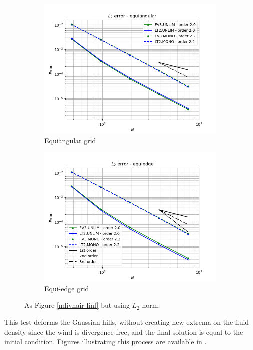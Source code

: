 \documentclass[preprint,12pt]{elsarticle}
\begin{document}
\begin{linenumbers}
\begin{figure}[!htb]
	\centering
	\begin{subfigure}{0.45\textwidth}
		\centering
		\includegraphics[width=1.1\linewidth]{l2error_tc-5_alpha0.equiangular}
		\caption{Equiangular grid\label{ndivnair-equiangular-2}}
	\end{subfigure}
	\begin{subfigure}{0.45\textwidth}
	\centering
	\includegraphics[width=1.1\linewidth]{l2error_tc-5_alpha0.equiedge}
	\caption{Equi-edge grid\label{ndivnair-equiedge-l2}}
    \end{subfigure}
	\caption{As Figure \ref{ndivnair-linf} but using $L_2$ norm.
		\label{ndivnair-l2}}
\end{figure}
This test deforms the Gaussian hills, without creating new extrema on the fluid density since the wind is divergence free, and the final solution is equal to the initial condition. 
Figures illustrating this process are available in \cite{nair:2010}.


\end{linenumbers}
\end{document}
